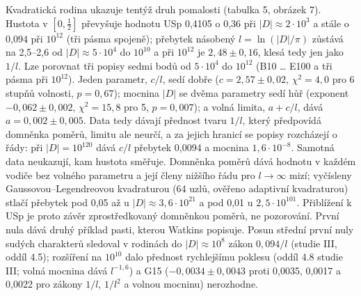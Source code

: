 \documentclass[
  10pt,
]{article}
\begin{document}
Kvadratická rodina ukazuje tentýž druh pomalosti (tabulka 5, obrázek 7).
Hustota v \([0, \frac12]\) převyšuje hodnotu USp 0,4105 o 0,36 při
\(|D| \approx 2\cdot10^3\) a stále o 0,094 při \(10^{12}\) (tři pásma
spojeně); přebytek násobený \(l = \ln(|D|/\pi)\) zůstává na 2,5--2,6 od
\(|D| \approx 5\cdot10^4\) do \(10^{10}\) a při \(10^{12}\) je
\(2{,}48 \pm 0{,}16\), klesá tedy jen jako \(1/l\). Lze porovnat tři
popisy sedmi bodů od \(5\cdot10^4\) do \(10^{12}\) (B10 \ldots{} E100 a
tři pásma při \(10^{12}\)). Jeden parametr, \(c/l\), sedí dobře
(\(c = 2{,}57 \pm 0{,}02\), \(\chi^2 = 4{,}0\) pro 6 stupňů volnosti,
\(p = 0{,}67\)); mocnina \(|D|\) se dvěma parametry sedí hůř (exponent
\(-0{,}062 \pm 0{,}002\), \(\chi^2 = 15{,}8\) pro 5, \(p = 0{,}007\)); a
volná limita, \(a + c/l\), dává \(a = 0{,}002 \pm 0{,}005\). Data tedy
dávají přednost tvaru \(1/l\), který předpovídá domněnka poměrů, limitu
ale neurčí, a za jejich hranicí se popisy rozcházejí o řády: při
\(|D| = 10^{120}\) dává \(c/l\) přebytek 0,0094 a mocnina
\(1{,}6\cdot10^{-8}\). Samotná data neukazují, kam hustota směřuje.
Domněnka poměrů dává hodnotu v každém vodiče bez volného parametru a
její členy nižšího řádu pro \(l \to \infty\) mizí; vyčísleny
Gaussovou--Legendreovou kvadraturou (64 uzlů, ověřeno adaptivní
kvadraturou) stlačí přebytek pod 0,05 až u
\(|D| \approx 3{,}6\cdot10^{21}\) a pod 0,01 u \(2{,}5\cdot10^{101}\).
Přiblížení k USp je proto závěr zprostředkovaný domněnkou poměrů, ne
pozorování. První nula dává druhý příklad pasti, kterou Watkins
popisuje. Posun střední první nuly sudých charakterů sledoval v rodinách
do \(|D| \approx 10^8\) zákon \(0{,}094/l\) (studie III, oddíl 4.5);
rozšíření na \(10^{10}\) dalo přednost rychlejšímu poklesu (oddíl 4.8
studie III; volná mocnina dává \(l^{-1{,}6}\)) a G15
(\(-0{,}0034 \pm 0{,}0043\) proti 0,0035, 0,0017 a 0,0022 pro zákony
\(1/l\), \(1/l^2\) a volnou mocninu) nerozhodne.
\end{document}
